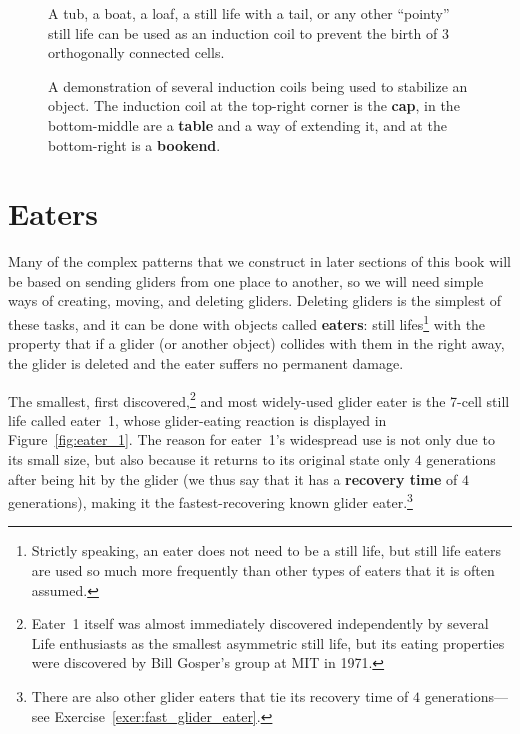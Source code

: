 \begin{figure}[!htb]
	\centering
	\begin{minipage}{.31\textwidth}
		\centering
		\caption{A tub, a boat, a loaf, a still life with a tail, or any other ``pointy'' still life can be used as an induction coil to prevent the birth of $3$ orthogonally connected cells.}
		\label{fig:5_cell_induction}
	\end{minipage} \quad %
	\begin{minipage}{.64\textwidth}
		\centering
		\caption{A demonstration of several induction coils being used to stabilize an object. The induction coil at the top-right corner is the \textbf{cap}, in the bottom-middle are a \textbf{table} and a way of extending it, and at the bottom-right is a \textbf{bookend}.}
		\label{fig:induction_coil_examples}
	\end{minipage}
\end{figure}


\section{Eaters}\label{sec:eaters}

Many of the complex patterns that we construct in later sections of this book will be based on sending gliders from one place to another, so we will need simple ways of creating, moving, and deleting gliders. Deleting gliders is the simplest of these tasks, and it can be done with objects called \textbf{eaters}: still lifes\footnote{Strictly speaking, an eater does not need to be a still life, but still life eaters are used so much more frequently than other types of eaters that it is often assumed.} with the property that if a glider (or another object) collides with them in the right away, the glider is deleted and the eater suffers no permanent damage.

The smallest, first discovered,\footnote{Eater~1 itself was almost immediately discovered independently by several Life enthusiasts as the smallest asymmetric still life, but its eating properties were discovered by Bill Gosper's group at MIT in 1971.} and most widely-used glider eater is the 7-cell still life called eater~1, whose glider-eating reaction is displayed in Figure~\ref{fig:eater_1}. The reason for eater~1's widespread use is not only due to its small size, but also because it returns to its original state only $4$ generations after being hit by the glider (we thus say that it has a \textbf{recovery time} of $4$ generations), making it the fastest-recovering known glider eater.\footnote{There are also other glider eaters that tie its recovery time of $4$ generations---see Exercise~\ref{exer:fast_glider_eater}.}

